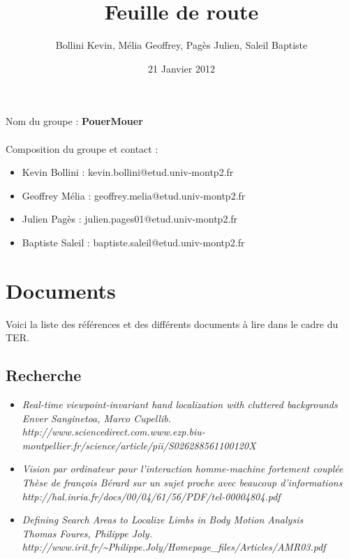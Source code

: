 \documentclass{article}
\title{Feuille de route}
\author{Bollini Kevin, Mélia Geoffrey, Pagès Julien, Saleil Baptiste}
\date{21 Janvier 2012}
\begin{document}
\maketitle
	Nom du groupe : \textbf{PouerMouer} \\
	\ \\
	Composition du groupe et contact :
	\begin{itemize}
	\item Kevin Bollini : kevin.bollini@etud.univ-montp2.fr \\
	\item Geoffrey Mélia : geoffrey.melia@etud.univ-montp2.fr \\
	\item Julien Pagès : julien.pages01@etud.univ-montp2.fr \\
	\item Baptiste Saleil : baptiste.saleil@etud.univ-montp2.fr \\
	\end{itemize} 	

\section{Documents}
	Voici la liste des références et des différents documents à lire dans le cadre du TER. \\

	\subsection{Recherche}
	\begin{itemize}
		\item \it{Real-time viewpoint-invariant hand localization with cluttered backgrounds} \\
		Enver Sanginetoa, Marco Cupellib. \\
		http://www.sciencedirect.com.www.ezp.biu-montpellier.fr/science/article/pii/S026288561100120X
		\item \it{Vision par ordinateur pour l’interaction homme-machine fortement couplée}\\
		Thèse de françois Bérard sur un sujet proche avec beaucoup d'informations \\
		http://hal.inria.fr/docs/00/04/61/56/PDF/tel-00004804.pdf
		\item \it{Defining Search Areas to Localize Limbs in Body Motion Analysis} \\
		Thomas Foures, Philippe Joly. \\
		http://www.irit.fr/\textasciitilde Philippe.Joly/Homepage\_files/Articles/AMR03.pdf \\
	\end{itemize}
\end{document}
